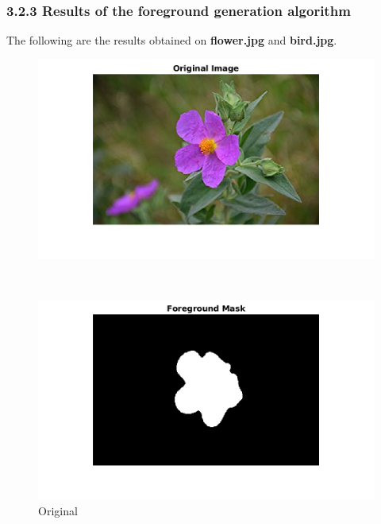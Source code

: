 \documentclass[12pt, a4paper]{article}
\begin{document}
\subsubsection*{3.2.3 Results of the foreground generation algorithm}
The following are the results obtained on \textbf{flower.jpg} and \textbf{bird.jpg}.
\vspace*{-15pt}
\begin{figure}[h!]
    \centering
    \renewcommand{\thefigure}{3.1(a)}
    \begin{minipage}[c][1\width]{0.3\textwidth}
    	\hspace*{-0.5in}
    	\includegraphics[width=1.44\textwidth]{flower_original.png}
    	\null\vspace*{-28pt}
    	\caption{Original}
	    \label{fig:3.1(a)}
    \end{minipage} \\
    \renewcommand{\thefigure}{3.1(b)}
    \begin{minipage}[c][1\width]{0.3\textwidth}
    	\hspace*{-1in}
    	\includegraphics[width=1.5\textwidth]{flower_mask.png}

\end{minipage}
\end{figure}
\end{document}
